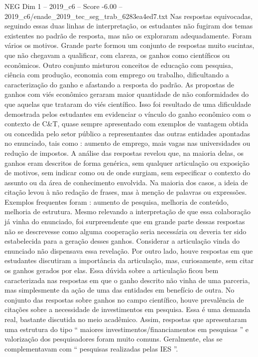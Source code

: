 \begin{textsample}{NEG Dim 1 – 2019\_c6 – Score -6.00 – 2019\_c6/enade\_2019\_tec\_seg\_trab\_6283ea4ed7.txt}
Nas respostas equivocadas, seguindo essas duas linhas de interpretação, os estudantes não fugiram dos temas existentes no padrão de resposta, mas não os exploraram adequadamente.
Foram vários os motivos.
Grande parte formou um conjunto de respostas muito sucintas, que não chegavam a qualificar, com clareza, os ganhos como científicos ou econômicos.
Outro conjunto misturou conceitos de educação com pesquisa, ciência com produção, economia com emprego ou trabalho, dificultando a caracterização do ganho e afastando a resposta do padrão.
As propostas de ganhos com viés econômico geraram maior quantidade de não conformidades do que aquelas que trataram do viés científico.
Isso foi resultado de uma dificuldade demostrada pelos estudantes em evidenciar o vínculo do ganho econômico com o contexto de C\&T, quase sempre apresentado com exemplos de vantagem obtida ou concedida pelo setor público a representantes das outras entidades apontadas no enunciado, tais como : aumento de emprego, mais vagas nas universidades ou redução de impostos.
A análise das respostas revelou que, na maioria delas, os ganhos eram descritos de forma genérica, sem qualquer articulação ou exposição de motivos, sem indicar como ou de onde surgiam, sem especificar o contexto do assunto ou da área de conhecimento envolvida.
Na maioria dos casos, a ideia de citação levou à não redação de frases, mas à menção de palavras ou expressões.
Exemplos frequentes foram : aumento de pesquisa, melhoria de conteúdo, melhoria de estrutura.
Mesmo relevando a interpretação de que essa colaboração já vinha do enunciado, foi surpreendente que em grande parte dessas respostas não se descrevesse como alguma cooperação seria necessária ou deveria ter sido estabelecida para a geração desses ganhos.
Considerar a articulação vinda do enunciado não dispensava essa revelação.
Por outro lado, houve respostas em que estudantes discutiram a importância da articulação, mas, curiosamente, sem citar os ganhos gerados por elas.
Essa dúvida sobre a articulação ficou bem caracterizada nas respostas em que o ganho descrito não vinha de uma parceria, mas simplesmente da ação de uma das entidades em benefício de outra.
No conjunto das respostas sobre ganhos no campo científico, houve prevalência de citações sobre a necessidade de investimentos em pesquisa.
Essa é uma demanda real, bastante discutida no meio acadêmico.
Assim, respostas que apresentaram uma estrutura do tipo “ maiores investimentos/financiamentos em pesquisas ” e valorização dos pesquisadores foram muito comuns.
Geralmente, elas se complementavam com “ pesquisas realizadas pelas IES ”.

\end{textsample}
